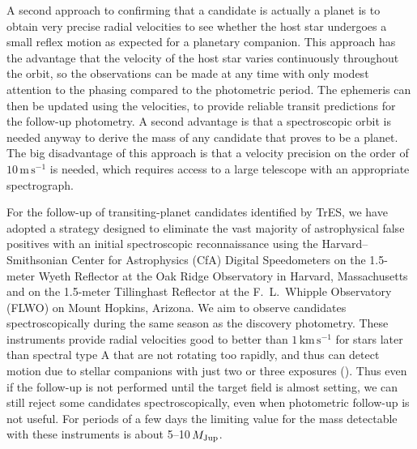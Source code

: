 A second approach to confirming that a candidate is actually a planet is to obtain very precise radial velocities to see whether the host star undergoes a small reflex motion as expected for a planetary companion. This approach has the advantage that the velocity of the host star varies continuously throughout the orbit, so the observations can be made at any time with only modest attention to the phasing compared to the photometric period.  The ephemeris can then be updated using the velocities, to provide reliable transit predictions for the follow-up photometry. A second advantage is that a spectroscopic orbit is needed anyway to derive the mass of any candidate that proves to be a planet.  The big disadvantage of this approach is that a velocity precision on the order of $10\,\mathrm{m\,s^{-1}}$ is needed, which requires access to a large telescope with an appropriate spectrograph.

For the follow-up of transiting-planet candidates identified by TrES, we have adopted a strategy designed to eliminate the vast majority of astrophysical false positives with an initial spectroscopic reconnaissance using the Harvard--Smithsonian Center for Astrophysics (CfA) Digital Speedometers \citep{Latham:ASP:1992a} on the 1.5-meter Wyeth Reflector at the Oak Ridge Observatory in Harvard, Massachusetts and on the 1.5-meter Tillinghast Reflector at the F.~L.~Whipple Observatory (FLWO) on Mount Hopkins, Arizona. We aim to observe candidates spectroscopically during the same season as the discovery photometry. These instruments provide radial velocities good to better than $1\,\mathrm{km\,s^{-1}}$ for stars later than spectral type A that are not rotating too rapidly, and thus can detect motion due to stellar companions with just two or three exposures (\citealp[see, e.g.,][]{Latham:ASP:2003a, Charbonneau_Brown_Dunham:AIP:2004a}). Thus even if the follow-up is not performed until the target field is almost setting, we can still reject some candidates spectroscopically, even when photometric follow-up is not useful. For periods of a few days the limiting value for the mass detectable with these instruments is about 5--10\,$M_{\rm Jup}$.

